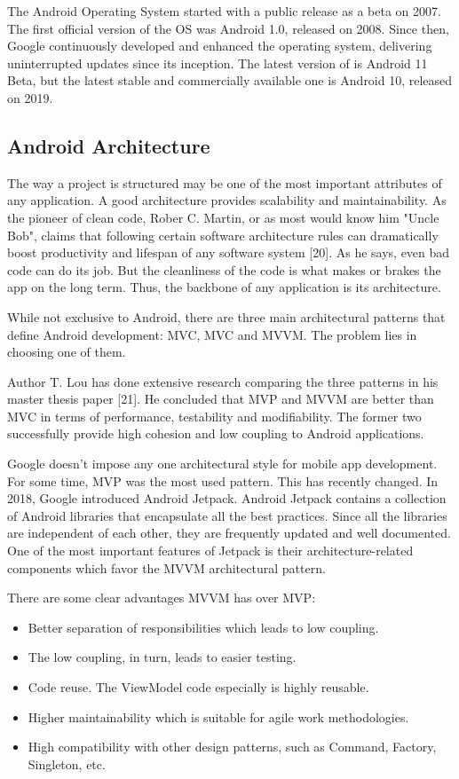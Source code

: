 \documentclass[12pt,a4paper,twoside]{report}
\begin{document}
 The Android Operating System started with a public release as a beta on 2007. The first official version of the OS was Android 1.0, released on 2008. Since then, Google continuously developed and enhanced the operating system, delivering uninterrupted updates since its inception. The latest version of is Android 11 Beta, but the latest stable and commercially available one is Android 10, released on 2019. 
 
 \newpage
 \subsection{Android Architecture}
 The way a project is structured may be one of the most important attributes of any application. A good architecture provides scalability and maintainability. As the pioneer of clean code, Rober C. Martin, or as most would know him "Uncle Bob", claims that following certain software architecture rules can dramatically boost productivity and lifespan of any software system [20]. As he says, even bad code can do its job. But the cleanliness of the code is what makes or brakes the app on the long term. Thus, the backbone of any application is its architecture.
 
 While not exclusive to Android, there are three main architectural patterns that define Android development: MVC, MVC and MVVM. The problem lies in choosing one of them.
 
 Author T. Lou has done extensive research comparing the three patterns in his master thesis paper [21]. He concluded that MVP and MVVM are better than MVC in terms of performance, testability and modifiability. The former two successfully provide high cohesion and low coupling to Android applications. 
 
 Google doesn't impose any one architectural style for mobile app development. For some time, MVP was the most used pattern. This has recently changed. In 2018, Google introduced Android Jetpack. Android Jetpack contains a collection of Android libraries that encapsulate all the best practices. Since all the libraries are independent of each other, they are frequently updated and well documented. One of the most important features of Jetpack is their architecture-related components which favor the MVVM architectural pattern.
 
 There are some clear advantages MVVM has over MVP:
 \begin{itemize}
     \item Better separation of responsibilities which leads to low coupling. 
     \item The low coupling, in turn, leads to easier testing.
     \item Code reuse. The ViewModel code especially is highly reusable.
     \item Higher maintainability which is suitable for agile work methodologies.
     \item High compatibility with other design patterns, such as Command, Factory, Singleton, etc.
 \end{itemize}
 
\end{document}
